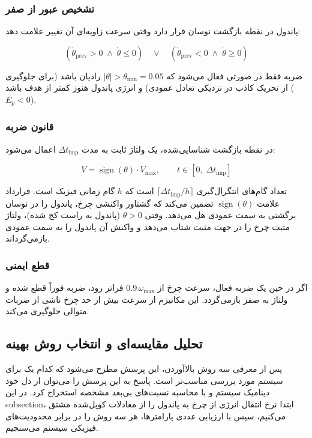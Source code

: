 \subsubsection{تشخیص عبور از صفر}

پاندول در نقطه بازگشت نوسان قرار دارد وقتی سرعت زاویه‌ای آن تغییر علامت دهد:

\begin{equation}
    (\dot\theta_{\text{prev}} > 0 \;\wedge\; \dot\theta \leq 0) \quad \lor \quad (\dot\theta_{\text{prev}} < 0 \;\wedge\; \dot\theta \geq 0)
\end{equation}

ضربه فقط در صورتی فعال می‌شود که $|\theta| > \theta_{\min} = 0.05$ رادیان باشد (برای جلوگیری از تحریک کاذب در نزدیکی تعادل عمودی) و انرژی پاندول هنوز کمتر از هدف باشد ($E_p < 0$).

\subsubsection{قانون ضربه}

در نقطه بازگشت شناسایی‌شده، یک ولتاژ ثابت به مدت $\Delta t_{\text{imp}}$ اعمال می‌شود:

\begin{equation}
    V = \operatorname{sign}(\theta) \cdot V_{\max}, \qquad t \in [0,\; \Delta t_{\text{imp}}]
\end{equation}

تعداد گام‌های انتگرال‌گیری $\lceil \Delta t_{\text{imp}} / h \rceil$ است که $h$ گام زمانی فیزیک است. قرارداد علامت $\operatorname{sign}(\theta)$ تضمین می‌کند که گشتاور واکنشی چرخ، پاندول را در نوسان برگشتی به سمت عمودی هل می‌دهد. وقتی $\theta > 0$ (پاندول به راست کج شده)، ولتاژ مثبت چرخ را در جهت مثبت شتاب می‌دهد و واکنش آن پاندول را به سمت عمودی بازمی‌گرداند.

\subsubsection{قطع ایمنی}

اگر در حین یک ضربه فعال، سرعت چرخ از $0.9\,\omega_{\max}$ فراتر رود، ضربه فوراً قطع شده و ولتاژ به صفر بازمی‌گردد. این مکانیزم از سرعت بیش از حد چرخ ناشی از ضربات متوالی جلوگیری می‌کند.

\subsection{تحلیل مقایسه‌ای و انتخاب روش بهینه}

پس از معرفی سه روش بالاآوردن، این پرسش مطرح می‌شود که کدام یک برای سیستم مورد بررسی مناسب‌تر است. پاسخ به این پرسش را می‌توان از دل خود دینامیک سیستم و با محاسبه نسبت‌های بی‌بعد مشخصه استخراج کرد. در این subsection، ابتدا نرخ انتقال انرژی از چرخ به پاندول را از معادلات کوپل‌شده مشتق می‌کنیم، سپس با ارزیابی عددی پارامترها، هر سه روش را در برابر محدودیت‌های فیزیکی سیستم می‌سنجیم.

